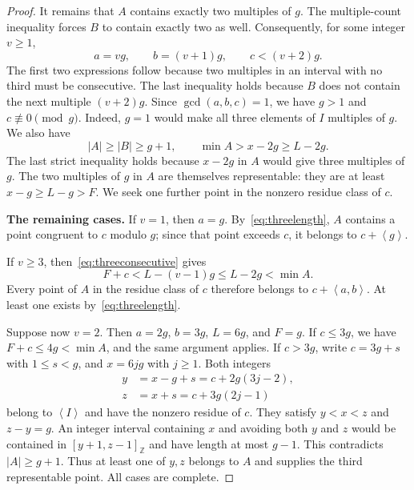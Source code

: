 \documentclass[11pt,a4paper]{article}
\numberwithin{equation}{section}
\theoremstyle{remark}
\newcommand{\Z}{\mathbb Z}
\newcommand{\sg}[1]{\left\langle #1\right\rangle}
\newcommand{\interval}[2]{[#1,#2]_{\Z}}
\begin{document}
\begin{proof}
It remains that $A$ contains exactly two multiples of $g$.
The multiple-count inequality forces $B$ to contain exactly two as well.
Consequently, for some integer $v\ge1$,
\begin{equation}\label{eq:threeconsecutive}
  a=vg,\qquad b=(v+1)g,\qquad c<(v+2)g.
\end{equation}
The first two expressions follow because two multiples in an interval
with no third must be consecutive. The last inequality holds because
$B$ does not contain the next multiple $(v+2)g$.
Since $\gcd(a,b,c)=1$, we have $g>1$ and $c\not\equiv0\pmod g$.
Indeed, $g=1$ would make all three elements of $I$ multiples of $g$.
We also have
\begin{equation}\label{eq:threelength}
  |A|\ge|B|\ge g+1,\qquad
  \min A>x-2g\ge L-2g.
\end{equation}
The last strict inequality holds because $x-2g$ in $A$ would give
three multiples of $g$.
The two multiples of $g$ in $A$ are themselves representable:
they are at least $x-g\ge L-g>F$.
We seek one further point in the nonzero residue class of $c$.

\textbf{The remaining cases.}
If $v=1$, then $a=g$.
By~\eqref{eq:threelength}, $A$ contains a point congruent to $c$
modulo $g$; since that point exceeds $c$, it belongs to
$c+\sg{g}$.

If $v\ge3$, then~\eqref{eq:threeconsecutive} gives
\[
  F+c<L-(v-1)g\le L-2g<\min A.
\]
Every point of $A$ in the residue class of $c$ therefore belongs to
$c+\sg{a,b}$. At least one exists by~\eqref{eq:threelength}.

Suppose now $v=2$. Then $a=2g$, $b=3g$, $L=6g$, and $F=g$.
If $c\le3g$, we have $F+c\le4g<\min A$, and the same argument
applies.
If $c>3g$, write $c=3g+s$ with $1\le s<g$, and $x=6jg$
with $j\ge1$. Both integers
\begin{equation}\label{eq:threewitnesses}
  \begin{split}
  y&=x-g+s=c+2g(3j-2),\\
  z&=x+s=c+3g(2j-1)
  \end{split}
\end{equation}
belong to $\sg{I}$ and have the nonzero residue of $c$.
They satisfy $y<x<z$ and $z-y=g$.
An integer interval containing $x$ and avoiding both $y$ and $z$
would be contained in $\interval{y+1}{z-1}$ and have length at most
$g-1$. This contradicts $|A|\ge g+1$.
Thus at least one of $y,z$ belongs to $A$ and supplies the third
representable point. All cases are complete.
\end{proof}
\end{document}
